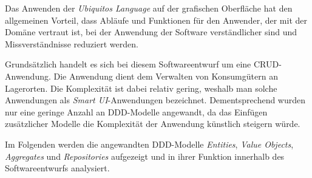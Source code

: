 Das Anwenden der \textit{Ubiquitos Language} auf der grafischen Oberfläche hat den allgemeinen Vorteil, dass Abläufe und Funktionen für den Anwender, der mit der Domäne vertraut ist, bei der Anwendung der Software verständlicher sind und Missverständnisse reduziert werden.

Grundsätzlich handelt es sich bei diesem Softwareentwurf um eine \ac{CRUD}-Anwendung.
Die Anwendung dient dem Verwalten von Konsumgütern an Lagerorten.
Die Komplexität ist dabei relativ gering, weshalb man solche Anwendungen als \textit{Smart UI}-Anwendungen bezeichnet.
Dementsprechend wurden nur eine geringe Anzahl an \ac{DDD}-Modelle angewandt, da das Einfügen zusätzlicher Modelle die Komplexität der Anwendung künstlich steigern würde.

Im Folgenden werden die angewandten \ac{DDD}-Modelle \textit{Entities}, \textit{Value Objects}, \textit{Aggregates} und \textit{Repositories} aufgezeigt und in ihrer Funktion innerhalb des Softwareentwurfs analysiert.

